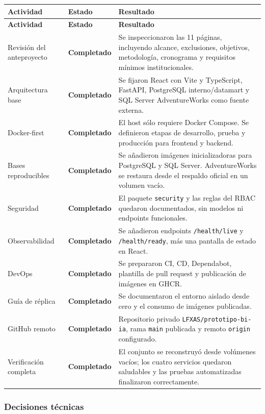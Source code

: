 \documentclass[11pt,letterpaper]{article}
\newcommand{\statusok}{\textcolor{deepgreen}{\textbf{Completado}}}
\newcommand{\file}[1]{\texttt{#1}}
\begin{document}
\begin{longtable}{@{}p{}p{}p{}@{}}
  \toprule
  \textbf{Actividad} & \textbf{Estado} & \textbf{Resultado} \\
  \midrule
  \endfirsthead
  \toprule
  \textbf{Actividad} & \textbf{Estado} & \textbf{Resultado} \\
  \midrule
  \endhead
  Revisión del anteproyecto & \statusok & Se inspeccionaron las 11 páginas, incluyendo alcance, exclusiones, objetivos, metodología, cronograma y requisitos mínimos institucionales. \\
  Arquitectura base & \statusok & Se fijaron React con Vite y TypeScript, FastAPI, PostgreSQL interno/datamart y SQL Server AdventureWorks como fuente externa. \\
  Docker-first & \statusok & El host sólo requiere Docker Compose. Se definieron etapas de desarrollo, prueba y producción para frontend y backend. \\
  Bases reproducibles & \statusok & Se añadieron imágenes inicializadoras para PostgreSQL y SQL Server. AdventureWorks se restaura desde el respaldo oficial en un volumen vacío. \\
  Seguridad & \statusok & El paquete \file{security} y las reglas del RBAC quedaron documentados, sin modelos ni endpoints funcionales. \\
  Observabilidad & \statusok & Se añadieron endpoints \file{/health/live} y \file{/health/ready}, más una pantalla de estado en React. \\
  DevOps & \statusok & Se prepararon CI, CD, Dependabot, plantilla de pull request y publicación de imágenes en GHCR. \\
  Guía de réplica & \statusok & Se documentaron el entorno aislado desde cero y el consumo de imágenes publicadas. \\
  GitHub remoto & \statusok & Repositorio privado \file{LFXAS/prototipo-bi-ia}, rama \file{main} publicada y remoto \file{origin} configurado. \\
  Verificación completa & \statusok & El conjunto se reconstruyó desde volúmenes vacíos; los cuatro servicios quedaron saludables y las pruebas automatizadas finalizaron correctamente. \\
  \bottomrule
\end{longtable}

\subsubsection{Decisiones técnicas}
\end{document}
